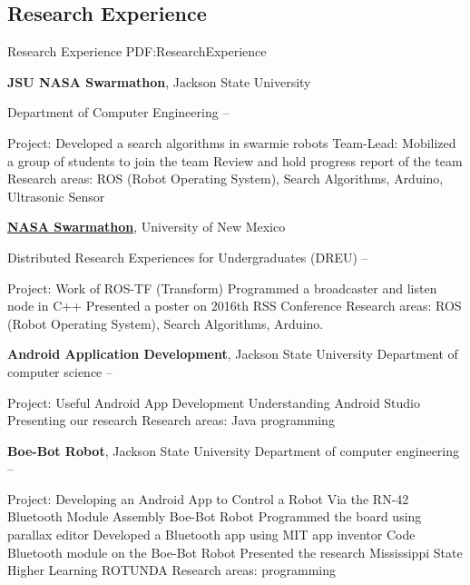 \documentclass[letterpaper,10pt,oneside]{article}
\begin{document}
\begin{body}
\section
{Research Experience}
{Research Experience}
{PDF:ResearchExperience}

{\textbf{ JSU NASA Swarmathon}}, Jackson State University

\GapNoBreak
\BulletItem
Department of Computer Engineering
\hfill
{} --
\begin{detail}
\SubBulletItem
Project:
Developed a search algorithms in swarmie robots
\SubBulletItem
Team-Lead: Mobilized a group of students to join the team
\SubBulletItem
Review and hold progress report of the team
\SubBulletItem
Research areas:
ROS (Robot Operating System), Search Algorithms, Arduino, Ultrasonic Sensor
\end{detail}

\href{http://nasaswarmathon.com/}
{\textbf{NASA Swarmathon}}, University of New Mexico

\GapNoBreak
\BulletItem
Distributed Research Experiences for Undergraduates
(DREU)
\hfill
{} --
\begin{detail}
\SubBulletItem
Project:
Work of ROS-TF (Transform) 
\SubBulletItem
Programmed a broadcaster and listen node in C++
\SubBulletItem
Presented a poster on 2016th RSS Conference 
\SubBulletItem
Research areas:
ROS (Robot Operating System), Search Algorithms, Arduino.
\end{detail}



{\textbf{Android Application Development}}, Jackson State University
\GapNoBreak
\BulletItem
Department of computer science
\hfill
{} --
\begin{detail}
\SubBulletItem
Project:
Useful Android App Development
\SubBulletItem
Understanding Android Studio
\SubBulletItem
Presenting our research
\SubBulletItem
Research areas:
Java programming
\end{detail}


{\textbf{Boe-Bot Robot}}, Jackson State University
\GapNoBreak
\BulletItem
Department of computer engineering
\hfill
{} --
\begin{detail}
\SubBulletItem
Project:
Developing an Android App to Control a Robot Via the RN-42 Bluetooth Module
\SubBulletItem
Assembly Boe-Bot Robot
\SubBulletItem
Programmed the board using parallax editor
\SubBulletItem
Developed a Bluetooth app using MIT app inventor
\SubBulletItem
Code Bluetooth module on the Boe-Bot Robot
\SubBulletItem
Presented the research Mississippi State Higher Learning ROTUNDA 
\SubBulletItem
Research areas:
programming
\end{detail}






\end{body}
\end{document}
